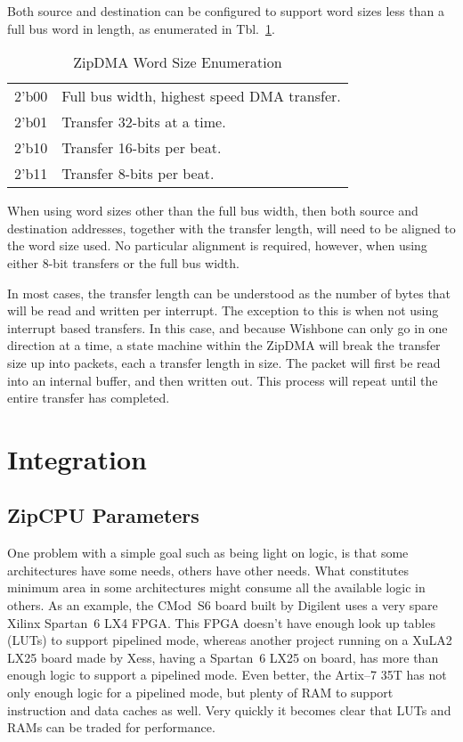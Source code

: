 \documentclass{gqtekspec}
\begin{document}
Both source and destination can be configured to support word sizes less
than a full bus word in length, as enumerated in Tbl.~\ref{tbl:zipdma-size}.
\begin{table}\begin{center}
\begin{tabular}{ll}\\\hline
2'b00 & Full bus width, highest speed DMA transfer.\\
2'b01 & Transfer 32-bits at a time.\\
2'b10 & Transfer 16-bits per beat.\\
2'b11 & Transfer 8-bits per beat.
\end{tabular}
\caption{ZipDMA Word Size Enumeration}\label{tbl:zipdma-size}
\end{center}\end{table}
When using word sizes other than the full bus width, then both source and
destination addresses, together with the transfer length, will need to be
aligned to the word size used.  No particular alignment is required, however,
when using either 8-bit transfers or the full bus width.

In most cases, the transfer length can be understood as the number of bytes
that will be read and written per interrupt.  The exception to this is when
not using interrupt based transfers.  In this case, and because Wishbone
can only go in one direction at a time, a state machine within the ZipDMA will
break the transfer size up into packets, each a transfer length in size.
The packet will first be read into an internal buffer, and then written out.
This process will repeat until the entire transfer has completed.
\chapter{Integration}\label{chap:integration}
\section{ZipCPU Parameters}\label{ssec:build-options}
One problem with a simple goal such as being light on logic, is that some
architectures have some needs, others have other needs.  What constitutes
minimum area in some architectures might consume all the available logic
in others.  As an example, the CMod~S6 board built by Digilent uses a very
spare Xilinx Spartan~6 LX4 FPGA.  This FPGA doesn't have enough look up tables
(LUTs) to support pipelined mode, whereas another project running on a XuLA2
LX25 board made by Xess, having a Spartan~6 LX25 on board, has more than
enough logic to support a pipelined mode.  Even better, the Artix--7 35T has
not only enough logic for a pipelined mode, but plenty of RAM to support
instruction and data caches as well.  Very quickly it becomes clear that
LUTs and RAMs can be traded for performance.
\end{document}
